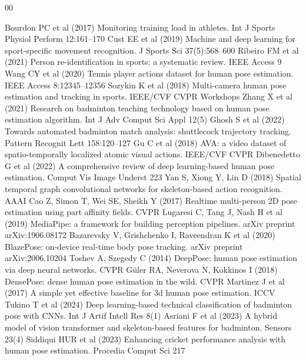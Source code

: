 \documentclass[pdflatex,sn-mathphys-num]{sn-jnl}%
\theoremstyle{thmstyleone}%
\theoremstyle{thmstyletwo}%
\theoremstyle{thmstylethree}%
\begin{document}

\begin{thebibliography}{00}

 Bourdon PC et al (2017) Monitoring training load in athletes. Int J Sports Physiol Perform 12:161--170
 Cust EE et al (2019) Machine and deep learning for sport-specific movement recognition. J Sports Sci 37(5):568--600
 Ribeiro FM et al (2021) Person re-identification in sports: a systematic review. IEEE Access 9
 Wang CY et al (2020) Tennis player actions dataset for human pose estimation. IEEE Access 8:12345--12356
 Sozykin K et al (2018) Multi-camera human pose estimation and tracking in sports. IEEE/CVF CVPR Workshops
 Zhang X et al (2021) Research on badminton teaching technology based on human pose estimation algorithm. Int J Adv Comput Sci Appl 12(5)
 Ghosh S et al (2022) Towards automated badminton match analysis: shuttlecock trajectory tracking. Pattern Recognit Lett 158:120--127
 Gu C et al (2018) AVA: a video dataset of spatio-temporally localized atomic visual actions. IEEE/CVF CVPR
 Dibenedetto G et al (2022) A comprehensive review of deep learning-based human pose estimation. Comput Vis Image Underst 223
 Yan S, Xiong Y, Lin D (2018) Spatial temporal graph convolutional networks for skeleton-based action recognition. AAAI
 Cao Z, Simon T, Wei SE, Sheikh Y (2017) Realtime multi-person 2D pose estimation using part affinity fields. CVPR
 Lugaresi C, Tang J, Nash H et al (2019) MediaPipe: a framework for building perception pipelines. arXiv preprint arXiv:1906.08172
 Bazarevsky V, Grishchenko I, Raveendran K et al (2020) BlazePose: on-device real-time body pose tracking. arXiv preprint arXiv:2006.10204
 Toshev A, Szegedy C (2014) DeepPose: human pose estimation via deep neural networks. CVPR
 G\"uler RA, Neverova N, Kokkinos I (2018) DensePose: dense human pose estimation in the wild. CVPR
 Martinez J et al (2017) A simple yet effective baseline for 3d human pose estimation. ICCV
 Tukino T et al (2024) Deep learning-based technical classification of badminton pose with CNNs. Int J Artif Intell Res 8(1)
 Asriani F et al (2023) A hybrid model of vision transformer and skeleton-based features for badminton. Sensors 23(4)
 Siddiqui HUR et al (2023) Enhancing cricket performance analysis with human pose estimation. Procedia Comput Sci 217

\end{thebibliography}
\end{document}
